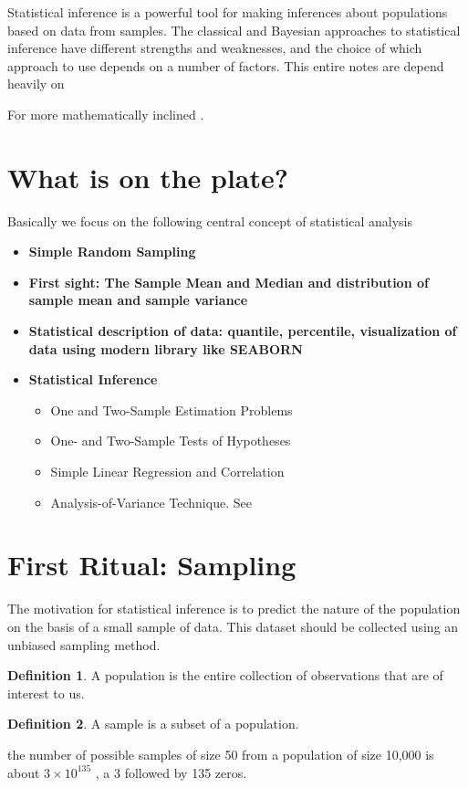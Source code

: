 \documentclass[12pt,a4paper]{article}
\theoremstyle{example}
\theoremstyle{definition}
\newtheorem{definition}{Definition}
\theoremstyle{theorem}
\begin{document}
Statistical inference is a powerful tool for making inferences about populations based on data from samples. The classical and Bayesian approaches to statistical inference have different strengths and weaknesses, and the choice of which approach to use depends on a number of factors. This entire notes are depend heavily on \cite{walpole1993probability, weiss2017introductory, ross2017introductory, ross2020introduction}

For more mathematically inclined \citep{lunn2007a,lunn2007b,ross2006,shannon1948}.

\section{What is on the plate?}\label{sec:methods}
Basically we focus on the following central concept of statistical analysis
\begin{itemize}
    \item \textbf{Simple Random Sampling}
    \item \textbf{First sight: The Sample Mean and Median and distribution of sample mean and sample variance }
    \item \textbf{Statistical description of data: quantile, percentile, visualization of data using modern library like SEABORN}
    \item \textbf{Statistical Inference }\begin{itemize}
        \item One and Two-Sample Estimation Problems
        \item One- and Two-Sample Tests of Hypotheses
        \item Simple Linear Regression and Correlation
        \item Analysis-of-Variance Technique. See \citep{ross2017introductory, bruce2014introductory, walpole1993probability}
    \end{itemize}
\end{itemize}
\section{First Ritual: Sampling}\label{sec:result}
The motivation for statistical inference is to predict the nature of the population on the basis of a small sample of data. This dataset should be collected using an unbiased sampling method.
\begin{definition}
    A population is the entire collection of observations that are of interest to us.
\end{definition}
\begin{definition}
    A sample is a subset of a population.
\end{definition}
the number of possible samples of size 50 from a population
of size 10,000 is about  $3 × 10^{135}$ , a 3 followed by 135 zeros.
\end{document}
